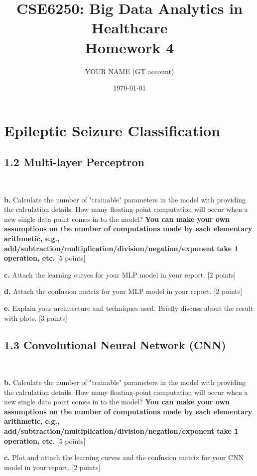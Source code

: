 \documentclass[12pt]{article}
\title{CSE6250: Big Data Analytics in Healthcare \\ Homework 4}
\author{YOUR NAME (GT account)}
\date{\today}
\begin{document}
\maketitle

\section{Epileptic Seizure Classification}

\subsection*{1.2 Multi-layer Perceptron}
~

\textbf{b.} Calculate the number of "trainable" parameters in the model with providing the calculation details. How many floating-point computation will occur when a new single data point comes in to the model?  \textbf{You can make your own assumptions on the number of computations made by each elementary arithmetic, e.g., add/subtraction/multiplication/division/negation/exponent take 1 operation, etc.} [5 points]



\bigskip

\textbf{c.} Attach the learning curves for your MLP model in your report. [2 points]

\bigskip

\textbf{d.} Attach the confusion matrix for your MLP model in your report. [2 points]

\bigskip
\textbf{e.} Explain your architecture and techniques used. Briefly discuss about the result with plots. [3 points]

\subsection*{1.3 Convolutional Neural Network (CNN)}
~

\textbf{b.} Calculate the number of "trainable" parameters in the model with providing the calculation details. How many floating-point computation will occur when a new single data point comes in to the model?  \textbf{You can make your own assumptions on the number of computations made by each elementary arithmetic, e.g., add/subtraction/multiplication/division/negation/exponent take 1 operation, etc.} [5 points]

\bigskip

\textbf{c.} Plot and attach the learning curves and the confusion matrix for your CNN model in your report. [2 points]
\end{document}
